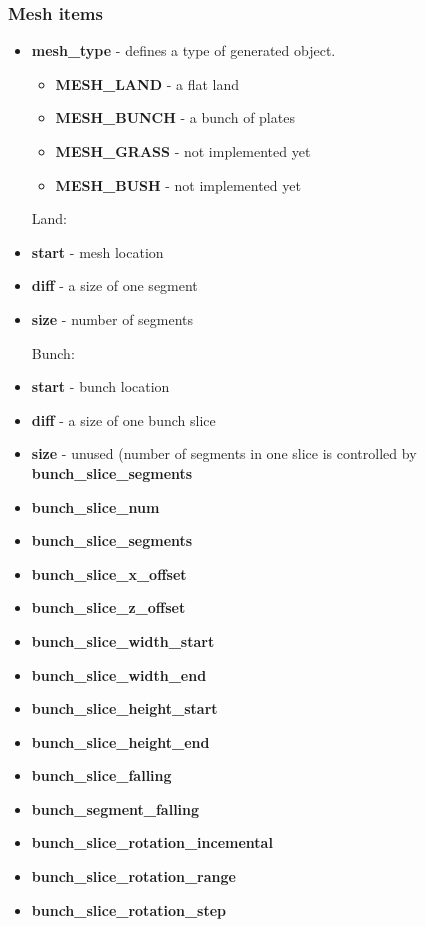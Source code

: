 \documentclass[9pt]{article}
\begin{document}
\subsubsection*{Mesh items}
\begin{itemize}
\item{\bf mesh\_type} - defines a type of generated object. 
\begin{itemize}
\item{\bf MESH\_LAND} - a flat land
\item{\bf MESH\_BUNCH} - a bunch of plates
\item{\bf MESH\_GRASS} - not implemented yet
\item{\bf MESH\_BUSH} - not implemented yet
\end{itemize}

Land:

\item{\bf start} - mesh location
\item{\bf diff} - a size of one segment
\item{\bf size} - number of segments

Bunch:

\item{\bf start} - bunch location
\item{\bf diff} - a size of one bunch slice
\item{\bf size} - unused (number of segments in one slice is controlled by {\bf bunch\_slice\_segments}

\item{\bf bunch\_slice\_num}
\item{\bf bunch\_slice\_segments}

\item{\bf bunch\_slice\_x\_offset}
\item{\bf bunch\_slice\_z\_offset}

\item{\bf bunch_slice_width_start}
\item{\bf bunch_slice_width_end}

\item{\bf bunch_slice_height_start}
\item{\bf bunch_slice_height_end}

\item{\bf bunch\_slice\_falling}
\item{\bf bunch\_segment\_falling}

\item{\bf bunch\_slice\_rotation\_incemental}
\item{\bf bunch\_slice\_rotation\_range}
\item{\bf bunch\_slice\_rotation\_step}
\end{itemize}
\end{document}
